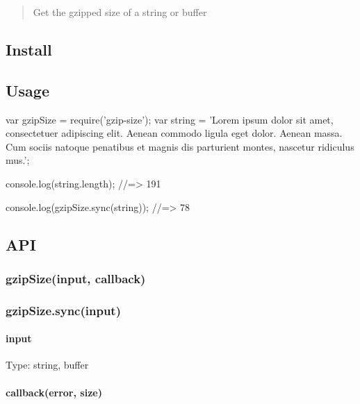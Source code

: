 \begin{quote}
Get the gzipped size of a string or buffer \end{quote}


\subsection*{Install}




\subsection*{Usage}


\begin{DoxyCode}
var gzipSize = require('gzip-size');
var string = 'Lorem ipsum dolor sit amet, consectetuer adipiscing elit. Aenean commodo ligula eget dolor.
       Aenean massa. Cum sociis natoque penatibus et magnis dis parturient montes, nascetur ridiculus mus.';

console.log(string.length);
//=> 191

console.log(gzipSize.sync(string));
//=> 78
\end{DoxyCode}


\subsection*{A\+PI}

\subsubsection*{gzip\+Size(input, callback)}

\subsubsection*{gzip\+Size.\+sync(input)}

\paragraph*{input}

Type\+: {\ttfamily string}, {\ttfamily buffer}

\paragraph*{callback(error, size)}

